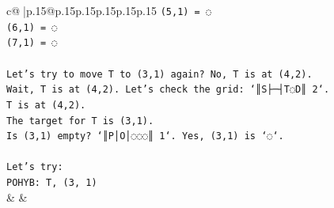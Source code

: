 \documentclass{article}
\begin{document}
{\begin{supertabular}{c@{$\;$}|p{.15\linewidth}@{}p{.15\linewidth}p{.15\linewidth}p{.15\linewidth}p{.15\linewidth}p{.15\linewidth}}
{{{\texttt{(5,1) = ◌} \\
\texttt{(6,1) = ◌} \\
\texttt{(7,1) = ◌} \\
\\ 
\texttt{Let's try to move T to (3,1) again? No, T is at (4,2).} \\
\texttt{Wait, T is at (4,2). Let's check the grid: `║S├─┤T◌D║ 2`.} \\
\texttt{T is at (4,2).} \\
\texttt{The target for T is (3,1).} \\
\texttt{Is (3,1) empty? `║P│O│◌◌◌║ 1`. Yes, (3,1) is `◌`.} \\
\\ 
\texttt{Let's try:} \\
\texttt{POHYB: T, (3, 1)} \\
            }
        }
    }
    & & \\ \\


\end{supertabular}}
\end{document}
